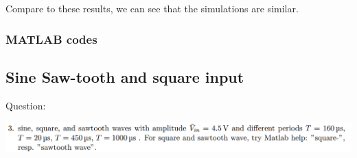 \documentclass[a4paper, 12pt]{article}
\begin{document}
Compare to these results, we can see that the simulations are similar. \par


\newpage
\subsubsection{MATLAB codes}
\par

\par

\par

\newpage
\subsection{Sine Saw-tooth and square input}
\indent Question:\par
\includegraphics[width=\textwidth]{ex1/q3.PNG}
\end{document}

